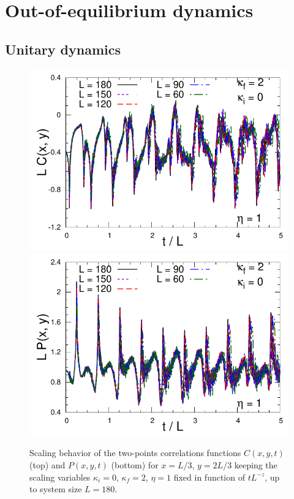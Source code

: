 \documentclass[pra,twocolumn,preprintnumbers,amsmath,amssymb,nofootinbib,floatfix,longbibliography]{revtex4}
\begin{document}
\section{Out-of-equilibrium dynamics}

\subsection{Unitary dynamics}

\begin{figure}[!htb]
  \includegraphics[width=0.95\columnwidth]
  {figs/Cqthk0q2e1.pdf}
    \includegraphics[width=0.95\columnwidth]
    {figs/Pqthk0q2e1.pdf}
    \caption{Scaling behavior of the two-points
    correlations functions $C(x,y,t)$ (top) and $P(x,y,t)$
    (bottom) for $x=L/3$, $y=2L/3$  keeping the scaling
variables $\kappa_i=0$,
    $\kappa_f=2$, $\eta =1$ fixed in function of $tL^{-z}$,
    up to system size $L=180$.}
  \label{qthk0q2e1}
\end{figure}
\end{document}
